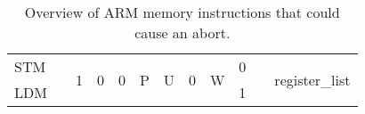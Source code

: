 \documentclass[a4paper,10pt]{report}
\begin{document}
\begin{table}[htb]
\begin{adjustbox}{center}
{\begin{tabular}{l|c|ccc|c|c|c|c|c|c|c|ccccc|cc|c|c|}
		\cline{1-1}\cline{3-10}\cline{12-21}
		STM                                                          &                        & \multirow{2}{*}{1}                   & \multirow{2}{*}{0}                                        & \multirow{2}{*}{0}                                      & \multirow{2}{*}{P}                     & \multirow{2}{*}{U}  & \multirow{2}{*}{0}                                      & \multirow{2}{*}{W}                     & 0                                    &                      & \multicolumn{10}{c|}{\multirow{2}{*}{register\_list}}                                                                                                                                                                                                                                                                                                                                \\ 
		\cline{1-1}\cline{10-10}
		LDM                                                          &                        &                                      &                                                           &                                                         &                                        &                     &                                                         &                                        & 1                                    &                      & \multicolumn{10}{c|}{}                                                                                                                                                                                                                                                                                                                                                               \\
		\hline
		\end{tabular}}
		\end{adjustbox}
		\caption{Overview of ARM memory instructions that could cause an abort.}
	\end{table}
\end{document}

